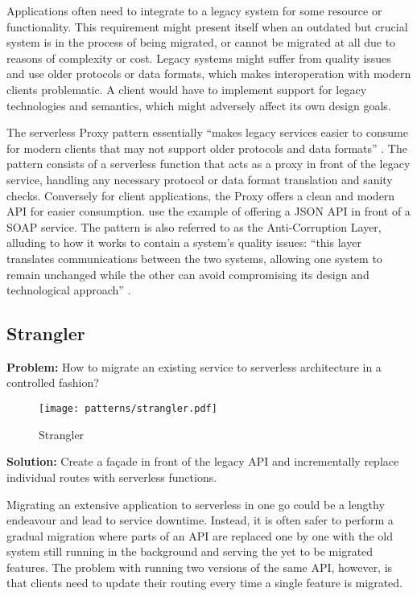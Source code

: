 Applications often need to integrate to a legacy system for some resource or functionality. This requirement might present itself when an outdated but crucial system is in the process of being migrated, or cannot be migrated at all due to reasons of complexity or cost. Legacy systems might suffer from quality issues and use older protocols or data formats, which makes interoperation with modern clients problematic. A client would have to implement support for legacy technologies and semantics, which might adversely affect its own design goals. \parencite{microsoft18cloudPatterns}

The serverless Proxy pattern essentially ``makes legacy services easier to consume for modern clients that may not support older protocols and data formats'' \parencite{sbarski2017serverless}. The pattern consists of a serverless function that acts as a proxy in front of the legacy service, handling any necessary protocol or data format translation and sanity checks. Conversely for client applications, the Proxy offers a clean and modern API for easier consumption. \textcite{sbarski2017serverless} use the example of offering a JSON API in front of a SOAP service. The pattern is also referred to as the Anti-Corruption Layer, alluding to how it works to contain a system's quality issues: ``this layer translates communications between the two systems, allowing one system to remain unchanged while the other can avoid compromising its design and technological approach'' \parencite{microsoft18cloudPatterns}.

\subsection{Strangler} \label{subsec:strangler}

\textbf{Problem:} How to migrate an existing service to serverless architecture in a controlled fashion?

\begin{figure}[h]
  \centering
  \texttt{[image: patterns/strangler.pdf]}
  \caption{Strangler}
  \label{fig:strangler}
\end{figure}

\textbf{Solution:} Create a façade in front of the legacy API and incrementally replace individual routes with serverless functions.

Migrating an extensive application to serverless in one go could be a lengthy endeavour and lead to service downtime. Instead, it is often safer to perform a gradual migration where parts of an API are replaced one by one with the old system still running in the background and serving the yet to be migrated features. The problem with running two versions of the same API, however, is that clients need to update their routing every time a single feature is migrated. \parencite{microsoft18cloudPatterns}

